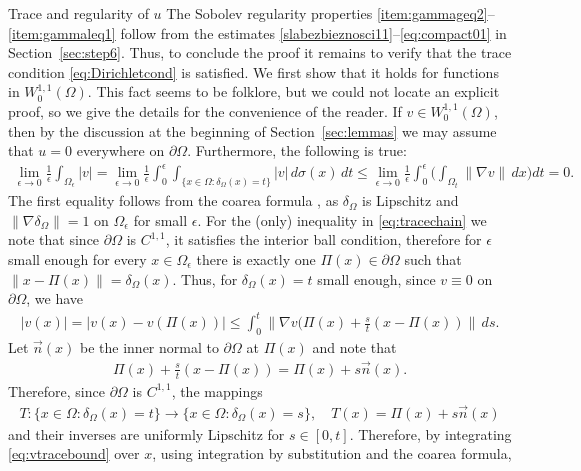 \documentclass[12pt,a4paper]{amsart}
\makeatletter
\theoremstyle{definition}
\renewcommand{\subsubsection}{\@startsection{subsubsection}{3}%
    \z@{.5\linespacing\@plus.7\linespacing}{-.5em}%
    {\normalfont\bfseries}}
\makeatother
\begin{document}
\subsubsection{Trace and regularity of $u$} The Sobolev regularity properties \ref{item:gammageq2}--\ref{item:gammaleq1} follow from the estimates \eqref{slabezbieznosci11}--\eqref{eq:compact01} in Section~\ref{sec:step6}. Thus, to conclude the proof it remains to verify that the trace condition \eqref{eq:Dirichletcond} is satisfied. We first show that it holds for functions in $W^{1,1}_0(\Omega)$. This fact seems to be folklore, but we could not locate an explicit proof, so we give the details for the convenience of the reader. If $v\in W^{1,1}_0(\Omega)$, then by the discussion at the beginning of Section~\ref{sec:lemmas} we may assume that $u=0$ everywhere on $\partial \Omega$. Furthermore, the following is true:
\begin{align}\label{eq:tracechain}
    \lim\limits_{\epsilon\to 0}\frac 1 \epsilon \int_{\Omega_\epsilon} |v| =\lim\limits_{\epsilon\to 0}\frac 1 \epsilon \int_0^\epsilon \int_{\{ x\in \Omega: \delta_\Omega (x) =t \} } |v| \, d\sigma (x)\, dt
\leq  \lim\limits_{\epsilon\to 0}\frac 1 \epsilon \int_0^\epsilon \bigg( \int_{\Omega_t} \|\nabla v\|\, dx  \bigg) dt =0.
\end{align}
The first equality follows from the coarea formula  \cite[Theorem~3.2.12]{MR257325}, as $\delta_\Omega$ is Lipschitz and $\|\nabla \delta_\Omega\|=1$ on $\Omega_\epsilon$ for small $\epsilon$. For the (only) inequality in \eqref{eq:tracechain} we note that since $\partial \Omega$ is $C^{1,1}$, it satisfies the interior ball condition, therefore for $\epsilon$ small enough for every $x\in \Omega_\epsilon$ there is exactly one $\Pi(x)\in \partial \Omega$ such that $\|x-\Pi(x)\| = \delta_\Omega(x)$. Thus, for $\delta_\Omega(x)=t$ small enough, since $v\equiv 0$ on $\partial \Omega$, we have 
\begin{align}\label{eq:vtracebound}
|v(x)| = |v(x) - v(\Pi(x))| \leq \int_0^{t} \|\nabla v (\Pi(x) + \frac{s}{t} (x-\Pi(x))\|\, ds. 
\end{align}
Let $\vec{n}(x)$ be the inner normal to $\partial \Omega$ at $\Pi(x)$ and note that
\begin{align*}
    \Pi(x) + \frac{s}{t} (x-\Pi(x)) = \Pi(x) + s\vec{n}(x).
\end{align*}
Therefore, since $\partial\Omega$ is $C^{1,1}$, the mappings \begin{align*}
    T\colon \{x\in \Omega: \delta_\Omega(x) =t\}\to \{x\in \Omega: \delta_\Omega(x) =s\},\quad T(x)= \Pi(x) + s\vec{n}(x) \end{align*} and their inverses are uniformly Lipschitz for $s\in [0,t]$. Therefore, by integrating \eqref{eq:vtracebound} over $x$, using integration by substitution and the coarea formula,
\end{document}
